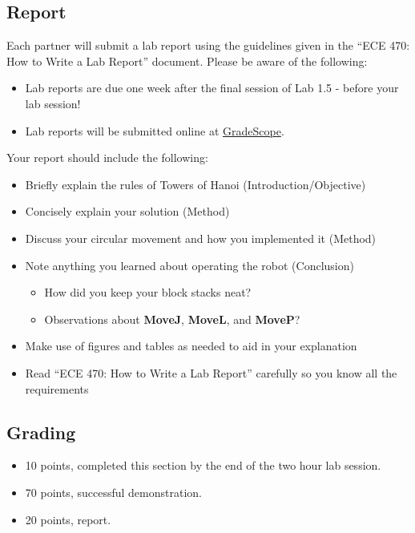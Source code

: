 \subsection{Report}
Each partner will submit a lab report using the guidelines given in the “ECE 470: How to Write a Lab Report” document.  Please be aware of the following:
\begin{itemize}
	\item Lab reports are due one week after the final session of Lab 1.5 - before your lab session!
	\item Lab reports will be submitted online at \href{www.gradescope.com}{GradeScope}.
\end{itemize}
Your report should include the following:
\begin{itemize}
	\item Briefly explain the rules of Towers of Hanoi (Introduction/Objective)
	\item Concisely explain your solution (Method)
	\item Discuss your circular movement and how you implemented it (Method)
	\item Note anything you learned about operating the robot (Conclusion)
	\begin{itemize}
		\item How did you keep your block stacks neat?
		\item Observations about \textbf{MoveJ}, \textbf{MoveL}, and \textbf{MoveP}?
	\end{itemize}
	\item Make use of figures and tables as needed to aid in your explanation
	\item Read “ECE 470: How to Write a Lab Report” carefully so you know all the requirements
	  
\end{itemize}
\subsection{Grading}
\begin{itemize}
\item 10 points, completed this section by the end of the two hour lab session.  
\item 70 points, successful demonstration.
\item 20 points, report.
\end{itemize}